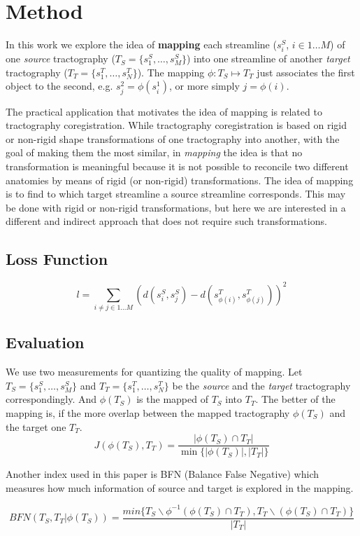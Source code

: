 \section{Method}
\label{sec:method}

In this work we explore the idea of \textbf{mapping} each streamline
($s^S_i$, $i \in 1 \ldots M$) of one \emph{source} tractography ($T_S
= \{s^S_1,\ldots,s^S_M\}$) into one streamline of another
\emph{target} tractography ($T_T = \{s^T_1,\ldots,s^T_N\}$). The
mapping $\phi: T_S \mapsto T_T$ just associates the first object to
the second, e.g. $s^2_j = \phi(s^1_i)$, or more simply $j = \phi(i)$.

The practical application that motivates the idea of mapping is
related to tractography coregistration. While tractography
coregistration is based on rigid or non-rigid shape transformations of
one tractography into another, with the goal of making them the most
similar, in \emph{mapping} the idea is that no transformation is
meaningful because it is not possible to reconcile two different
anatomies by means of rigid (or non-rigid) transformations. The idea
of mapping is to find to which target streamline a source streamline
corresponds. This may be done with rigid or non-rigid transformations,
but here we are interested in a different and indirect approach that
does not require such transformations.

\subsection{Loss Function}
\begin{equation}
  \label{eq:loss}
  l = \sum_{i \neq j \in 1 \ldots M} (d(s^S_i, s^S_j) -
  d(s^T_{\phi(i)}, s^T_{\phi(j)}))^2
\end{equation}

\subsection{Evaluation}
We use two measurements for quantizing the quality of mapping. 
Let $T_S = \{s^S_1,\ldots,s^S_M\}$ and $T_T = \{s^T_1,\ldots,s^T_N\}$ be the \emph{source} and the \emph{target} tractography correspondingly. And $\phi(T_S)$ is the mapped of $T_S$ into $T_T$.
The better of the mapping is, if the more overlap between the mapped tractography $\phi(T_S)$ and the target one $T_T$.
\begin{equation}
  \label{eq:Jaccard}
  J(\phi(T_S), T_T) = \frac{|\phi(T_S) \cap T_T|}{ \min\{|\phi(T_S)|, |T_T|\}}
\end{equation}

Another index used in this paper is BFN (Balance False Negative) which measures how much information of source and target is explored in the mapping.

\begin{equation}
  \label{eq:BFN}
  BFN(T_S, T_T|\phi(T_S)) = \frac{min\{T_S \backslash \phi^{-1}(\phi(T_S) \cap T_T), T_T \backslash (\phi(T_S) \cap T_T)\}}{|T_T|}
\end{equation}

